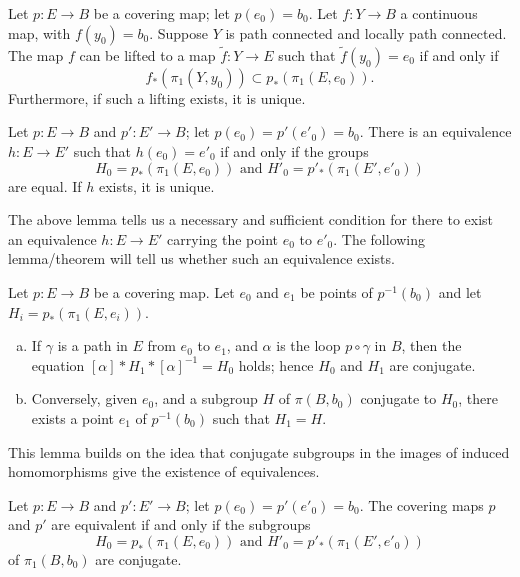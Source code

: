 \begin{lemma}
Let $p\colon E \rightarrow B$ be a covering map; let $p(e_0) = b_0$. Let $f\colon Y \rightarrow B$ a continuous map, with $f(y_0) = b_0$. 
Suppose $Y$ is path connected and locally path connected. The map $f$ can be lifted to a map
$\tilde{f} \colon  Y \rightarrow E$ such that $\tilde{f}(y_0) = e_0$ if and only if
\[
    f_{\ast}(\pi_1(Y, y_0)) \subset p_{\ast}(\pi_1(E, e_0)).
\]
Furthermore, if such a lifting exists, it is unique.
\end{lemma}

\begin{theorem}
Let $p \colon E \rightarrow B$ and $p' \colon E' \rightarrow B$; let $p(e_0) = p'(e'_0) = b_0$. There is an equivalence $h \colon E \rightarrow E'$ such that $h(e_0) = e'_0$ if and only if the groups
\[
    H_0 = p_*(\pi_1(E, e_0)) \text{ and } H'_0 = p'_*(\pi_1(E', e'_0))
\]
are equal. If $h$ exists, it is unique.
\end{theorem}

The above lemma tells us a necessary and sufficient condition for there to exist an equivalence $h \colon E \rightarrow E'$ carrying the point $e_0$ to $e'_0$. The following lemma/theorem will tell us whether such an equivalence exists. 

\begin{lemma}
Let $p \colon E \rightarrow B$ be a covering map. Let $e_0$ and $e_1$ be points of $p^{-1}(b_0)$ and let $H_i = p_*(\pi_1(E, e_i))$.
\begin{enumerate}[a)]
    \item If $\gamma$ is a path in $E$ from $e_0$ to $e_1$, and $\alpha$ is the loop $p \circ \gamma$ in $B$, then the equation $[\alpha] * H_1 * [\alpha]^{-1} = H_0$ holds; hence $H_0$ and $H_1$ are conjugate.
    \item Conversely, given $e_0$, and a subgroup $H$ of $\pi(B, b_0)$ conjugate to $H_0$, there exists a point $e_1$ of $p^{-1}(b_0)$ such that $H_1 = H$.
\end{enumerate}
\end{lemma}

\begin{remark}
This lemma builds on the idea that conjugate subgroups in the images of induced homomorphisms give the existence of equivalences.
\end{remark}

\begin{theorem}
Let $p \colon E \rightarrow B$ and $p' \colon E' \rightarrow B$; let $p(e_0) = p'(e'_0) = b_0$. The covering maps $p$ and $p'$ are equivalent if and only if the subgroups
\[
    H_0 = p_*(\pi_1(E, e_0)) \text{ and } H'_0 = p'_*(\pi_1(E', e'_0))
\]
of $\pi_1(B, b_0)$ are conjugate.
\end{theorem}

